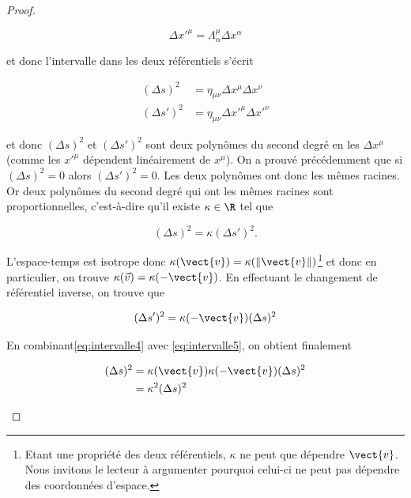\begin{proof}
\begin{enumerate}
\begin{equation}
    \label{eq:intervalle1}
    \Delta x'^{\mu} = \Lambda^{\mu}_{\alpha} \Delta x^{\alpha}
\end{equation}

et donc l'intervalle dans les deux référentiels s'écrit

\begin{align}
    \label{eq:intervalle2}
    (\Delta s)^2 & = \eta _{\mu \nu} \Delta x^{\mu} \Delta x^{\nu}\\
    \label{eq:intervalle3}
    (\Delta s')^2 & = \eta _{\mu \nu} \Delta x'^{\mu} \Delta x'^{\nu}
\end{align}

et donc $(\Delta s)^2$ et $(\Delta s')^2$ sont deux polynômes du second degré en les $\Delta x^{\mu}$ (comme les $x'^\mu$ dépendent linéairement de $x^\mu$). On a prouvé précédemment que si  $(\Delta s)^2 = 0$ alors   $(\Delta s')^2 = 0$. Les deux polynômes ont donc les mêmes racines. Or deux polynômes du second degré qui ont les mêmes racines sont proportionnelles, c'est-à-dire qu'il existe $\kappa\in \R$ tel que

\begin{equation} 
\label{eq:intervalle4}
(\Delta s)^2 = \kappa (\Delta s')^2.
\end{equation}

L'espace-temps est isotrope donc $\kappa(\vect{v})=\kappa(\lVert \vect{v} \rVert)$\footnote{Etant une propriété des deux référentiels, $\kappa$ ne peut que dépendre $\vect{v}$. Nous invitons le lecteur à argumenter pourquoi celui-ci ne peut pas dépendre des coordonnées d'espace.} et donc en particulier, on trouve $\kappa(\Vec{v}) = \kappa(-\vect{v})$. En effectuant le changement de référentiel inverse, on trouve que

\begin{equation}
    (\Delta s')^2 = \kappa(-\vect{v}) (\Delta s)^2
    \label{eq:intervalle5}
\end{equation}

En combinant\ref{eq:intervalle4} avec \ref{eq:intervalle5}, on obtient finalement

\begin{align}
    (\Delta s)^2 &= \kappa(\vect{v}) \kappa(-\vect{v}) (\Delta s)^2\\
    &= \kappa^2(\Delta s)^2
\end{align}


\end{enumerate}
\end{proof}
